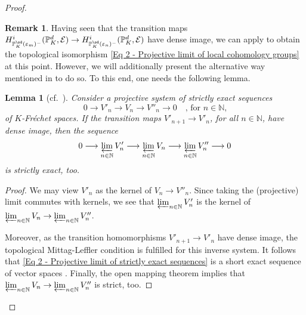 \documentclass[a4paper, reqno, 10pt]{amsart}
\newtheorem{lemma}[theorem]{Lemma}
\theoremstyle{definition}
\newtheorem{remark}[theorem]{Remark}
\numberwithin{equation}{section}
\newcommand{\lra}{\longrightarrow}
\newcommand{\ra}{\rightarrow}
\newcommand{\BN}{{\mathbb {N}}}
\newcommand{\BP}{{\mathbb {P}}}
\newcommand{\CE}{{\mathcal {E}}}
\begin{document}
\begin{proof}
	
	
	\begin{remark}
		Having seen that the transition maps $H^{i}_{\BP_K^\sd(\varepsilon_m)^-} (\BP_K^d, \CE) \ra H^{i}_{\BP_K^\sd(\varepsilon_n)^-} (\BP_K^d, \CE)$ have dense image, we can apply \cite[Prop.\ 1.3.3]{Orlik08EquivVBDrinfeldUpHalfSp} to obtain the topological isomorphism \eqref{Eq 2 - Projective limit of local cohomology groups} at this point. 
		However, we will additionally present the alternative way mentioned in \cite[Rmk.\ 1.3.6]{Orlik08EquivVBDrinfeldUpHalfSp} to do so.
		To this end, one needs the following lemma.
	\end{remark}	
	
	
	
	
	\begin{lemma}[{cf.\ \cite[Lemma 1.3.7]{Orlik08EquivVBDrinfeldUpHalfSp}}]\label{Lemma 2 - Exactness of projective limit when topological ML property}
		Consider a projective system of strictly exact sequences
		\begin{equation*}
			0 \lra V'_n \lra V_n \lra V''_n \lra 0 \quad\text{, for $n\in \BN$,}
		\end{equation*}
		of $K$-Fr\'echet spaces.
		If the transition maps $V'_{n+1}\ra V'_n$, for all $n\in \BN$, have dense image, then the sequence
		\begin{equation}\label{Eq 2 - Projective limit of strictly exact sequences}
			0 \lra \varprojlim_{n\in \BN} V'_n \lra \varprojlim_{n\in \BN} V_n \lra \varprojlim_{n\in \BN} V''_n \lra 0
		\end{equation}
		is strictly exact, too.
	\end{lemma}
	\begin{proof}
		We may view $V'_n$ as the kernel of $V_n \ra V''_n$.
		Since taking the (projective) limit commutes with kernels, we see that $\varprojlim_{n\in \BN} V'_n$ is the kernel of $\varprojlim_{n\in \BN} V_n \ra \varprojlim_{n\in \BN} V''_n$.
		
		
		Moreover, as the transition homomorphisms $V'_{n+1} \ra V'_n$ have dense image, the topological Mittag-Leffler condition is fulfilled for this inverse system.
		It follows that \eqref{Eq 2 - Projective limit of strictly exact sequences} is a short exact sequence of vector spaces \cite[13.2.4 (i)]{Grothendieck61EGA3.1}.
		Finally, the open mapping theorem \cite[Prop.\ 8.6]{Schneider02NonArchFunctAna} implies that $\varprojlim_{n\in \BN} V_n \ra \varprojlim_{n\in \BN} V''_n$ is strict, too.
	\end{proof}


\end{proof}
\end{document}
